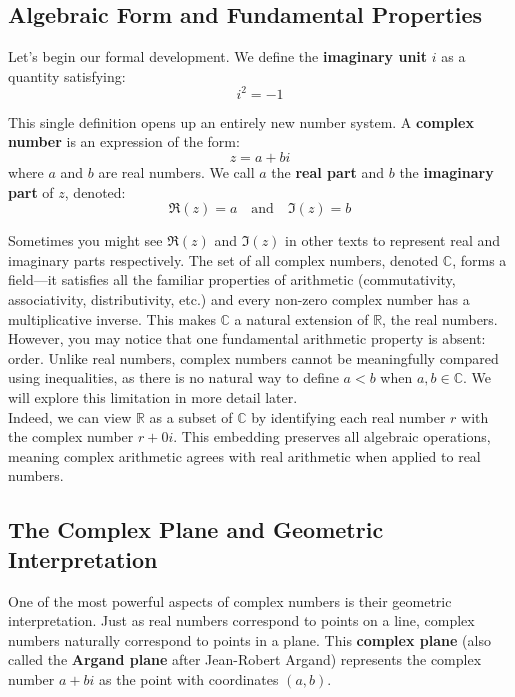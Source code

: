 \subsection*{Algebraic Form and Fundamental Properties} 

\noindent Let's begin our formal development. We define the \textbf{imaginary unit} $i$ as a quantity satisfying:
\[
i^2 = -1
\]

\noindent This single definition opens up an entirely new number system. A \textbf{complex number} is an expression of the form:
\[
z = a + bi
\]
where $a$ and $b$ are real numbers. We call $a$ the \textbf{real part} and $b$ the \textbf{imaginary part} of $z$, denoted:
\[
\Re(z) = a \quad \text{and} \quad \Im(z) = b
\]

\noindent Sometimes you might see $\mathfrak{R}(z)$ and $\mathfrak{I}(z)$ in other texts to represent real and imaginary parts respectively. The set of all complex numbers, denoted $\mathbb{C}$, forms a field—it satisfies all the familiar properties of arithmetic (commutativity, associativity, distributivity, etc.) and every non-zero complex number has a multiplicative inverse. This makes $\mathbb{C}$ a natural extension of $\mathbb{R}$, the real numbers. However, you may notice that one fundamental arithmetic property is absent: order. Unlike real numbers, complex numbers cannot be meaningfully compared using inequalities, as there is no natural way to define \( a < b \) when \( a, b \in \mathbb{C} \). We will explore this limitation in more detail later. \\


\noindent Indeed, we can view $\mathbb{R}$ as a subset of $\mathbb{C}$ by identifying each real number $r$ with the complex number $r + 0i$. This embedding preserves all algebraic operations, meaning complex arithmetic agrees with real arithmetic when applied to real numbers.

\subsection*{The Complex Plane and Geometric Interpretation} 

\noindent One of the most powerful aspects of complex numbers is their geometric interpretation. Just as real numbers correspond to points on a line, complex numbers naturally correspond to points in a plane. This \textbf{complex plane} (also called the \textbf{Argand plane} after Jean-Robert Argand) represents the complex number $a + bi$ as the point with coordinates $(a,b)$. \\

